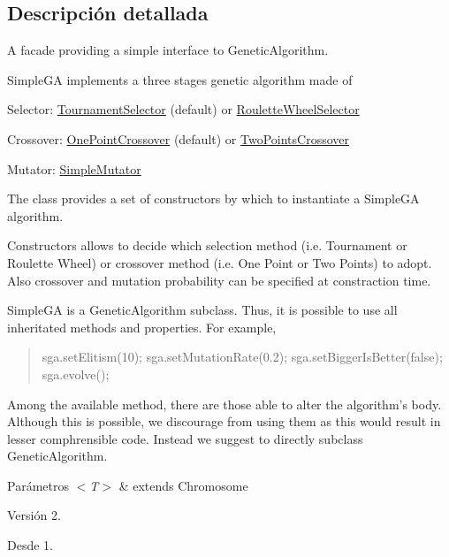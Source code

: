 \subsection{Descripción detallada}
A facade providing a simple interface to Genetic\-Algorithm. 

{\ttfamily Simple\-G\-A} implements a three stages genetic algorithm made of 
\begin{DoxyItemize}
\item Selector\-: \hyperlink{}{Tournament\-Selector} (default) or \hyperlink{}{Roulette\-Wheel\-Selector} 
\item Crossover\-: \hyperlink{}{One\-Point\-Crossover} (default) or \hyperlink{}{Two\-Points\-Crossover} 
\item Mutator\-: \hyperlink{}{Simple\-Mutator} 
\end{DoxyItemize}The class provides a set of constructors by which to instantiate a {\ttfamily Simple\-G\-A} algorithm. 

Constructors allows to decide which selection method (i.\-e. Tournament or Roulette Wheel) or crossover method (i.\-e. One Point or Two Points) to adopt. Also crossover and mutation probability can be specified at constraction time. 

{\ttfamily Simple\-G\-A} is a {\ttfamily Genetic\-Algorithm} subclass. Thus, it is possible to use all inheritated methods and properties. For example, 

\begin{quotation}

\begin{DoxyPre}
 sga.setElitism(10);
 sga.setMutationRate(0.2);
 sga.setBiggerIsBetter(false);
 sga.evolve();
\end{DoxyPre}
\end{quotation}


Among the available method, there are those able to alter the algorithm's body. Although this is possible, we discourage from using them as this would result in lesser comphrensible code. Instead we suggest to directly subclass {\ttfamily Genetic\-Algorithm}. 


\begin{DoxyParams}{Parámetros}
{\em $<$\-T$>$} & extends Chromosome\\
\hline
\end{DoxyParams}
\begin{DoxyVersion}{Versión}
2. 
\end{DoxyVersion}
\begin{DoxySince}{Desde}
1. 
\end{DoxySince}


